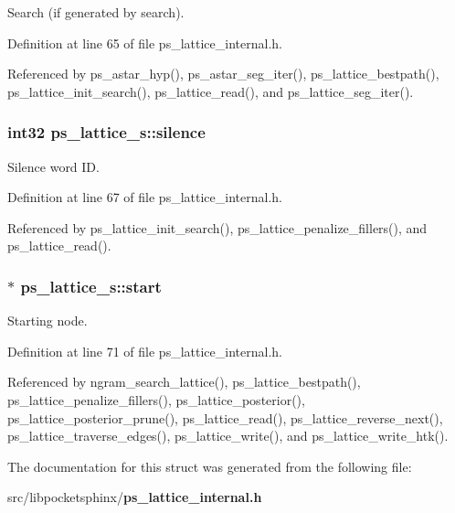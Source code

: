 Search (if generated by search). 



Definition at line 65 of file ps\-\_\-lattice\-\_\-internal.\-h.



Referenced by ps\-\_\-astar\-\_\-hyp(), ps\-\_\-astar\-\_\-seg\-\_\-iter(), ps\-\_\-lattice\-\_\-bestpath(), ps\-\_\-lattice\-\_\-init\-\_\-search(), ps\-\_\-lattice\-\_\-read(), and ps\-\_\-lattice\-\_\-seg\-\_\-iter().

\subsubsection[{silence}]{\setlength{\rightskip}{0pt plus 5cm}int32 ps\-\_\-lattice\-\_\-s\-::silence}\label{structps__lattice__s_acd3f3ab2649f649ba33bf2a422cf12b8}


Silence word I\-D. 



Definition at line 67 of file ps\-\_\-lattice\-\_\-internal.\-h.



Referenced by ps\-\_\-lattice\-\_\-init\-\_\-search(), ps\-\_\-lattice\-\_\-penalize\-\_\-fillers(), and ps\-\_\-lattice\-\_\-read().

\subsubsection[{start}]{$\ast$ ps\-\_\-lattice\-\_\-s\-::start}\label{structps__lattice__s_a5d936695a3813e117d20b585d48db8fe}


Starting node. 



Definition at line 71 of file ps\-\_\-lattice\-\_\-internal.\-h.



Referenced by ngram\-\_\-search\-\_\-lattice(), ps\-\_\-lattice\-\_\-bestpath(), ps\-\_\-lattice\-\_\-penalize\-\_\-fillers(), ps\-\_\-lattice\-\_\-posterior(), ps\-\_\-lattice\-\_\-posterior\-\_\-prune(), ps\-\_\-lattice\-\_\-read(), ps\-\_\-lattice\-\_\-reverse\-\_\-next(), ps\-\_\-lattice\-\_\-traverse\-\_\-edges(), ps\-\_\-lattice\-\_\-write(), and ps\-\_\-lattice\-\_\-write\-\_\-htk().



The documentation for this struct was generated from the following file\-:\begin{DoxyCompactItemize}
\item 
src/libpocketsphinx/{\bf ps\-\_\-lattice\-\_\-internal.\-h}\end{DoxyCompactItemize}
